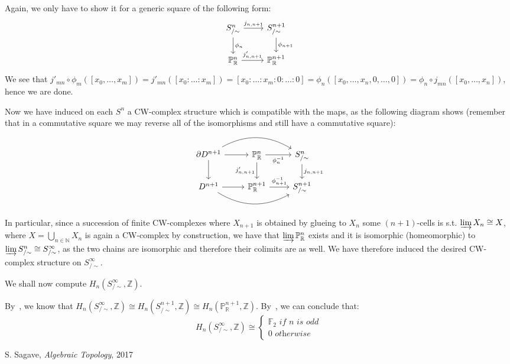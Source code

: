 \documentclass{article}
\newcommand{\numberset}{\mathbb}
\newcommand{\N}{\numberset{N}}
\newcommand{\Z}{\numberset{Z}}
\newcommand{\R}{\numberset{R}}
\newcommand{\F}{\numberset{F}}
\newcommand{\Ps}{\mathbb{P}}
\begin{document}
Again, we only have to show it for a generic square of the following form:
\[
  \begin{tikzcd}
    S^n_{/\sim}\arrow{r}{j_{n,n+1}}\arrow{d}{\phi_n} & S^{n+1}_{/\sim}\arrow{d}{\phi_{n+1}} \\
    \Ps^n_{\R}\arrow{r}{j'_{n,n+1}} & \Ps^{n+1}_{\R}
  \end{tikzcd}
\]
We see that $j'_{mn}\circ\phi_m([x_0,\ldots,x_m])=j'_{mn}([x_0:\ldots:x_m])=[x_0:\ldots:x_m:0:\ldots:0]=\phi_n([x_0,\ldots,x_n,0,\ldots,0])=\phi_n\circ j_{mn}([x_0,\ldots,x_n])$, hence we are done.

Now we have induced on each $S^n$ a CW-complex structure which is compatible with the maps, as the following diagram shows (remember that in a commutative square we may reverse all of the isomorphisms and still have a commutative square):
\[
  \begin{tikzcd}
    \partial D^{n+1}\arrow{d}\arrow{r}\arrow[bend left]{rr} & \Ps^n_{\R}\arrow[swap]{d}{j'_{n,n+1}}\arrow[swap]{r}{\phi_n^{-1}} & S^n_{/\sim}\arrow{d}{j_{n,n+1}} \\
    D^{n+1}\arrow{r}\arrow[bend right]{rr} & \Ps^{n+1}_{\R}\arrow{r}{\phi_{n+1}^{-1}} & S^{n+1}_{/\sim}
  \end{tikzcd}
\]

In particular, since a succession of finite CW-complexes where $X_{n+1}$ is obtained by glueing to $X_n$ some $(n+1)$-cells is s.t. $\varinjlim X_n\cong X$, where $X=\bigcup_{n\in\N} X_n$ is again a CW-complex by construction, we have that $\varinjlim \Ps^n_{\R}$ exists and it is isomorphic (homeomorphic) to $\varinjlim S^n_{/\sim}\cong S^{\infty}_{/\sim}$, as the two chains are isomorphic and therefore their colimits are as well. We have therefore induced the desired CW-complex structure on $S^{\infty}_{/\sim}$.

We shall now compute $H_n(S^{\infty}_{/\sim},\Z)$.

By~\cite[prop. 9.12]{sag}, we know that $H_n(S^{\infty}_{/\sim},\Z)\cong H_n(S^{n+1}_{/\sim},\Z)\cong H_n(\Ps^{n+1}_{\R},\Z)$. By~\cite[thm. 10.9]{sag}, we can conclude that:
$$
  H_n(S^{\infty}_{/\sim},\Z)\cong\begin{cases}
    \F_2\textit{ if $n$ is odd} \\
    0\textit{ otherwise}
  \end{cases}
$$



\begin{thebibliography}{9}
    S. Sagave,
    \textit{Algebraic Topology},
    2017
\end{thebibliography}
\end{document}
